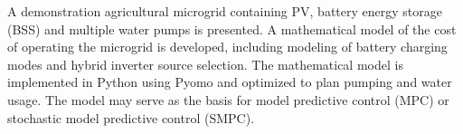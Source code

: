 A demonstration agricultural microgrid containing PV, battery energy storage (BSS) and multiple water pumps is presented.
A mathematical model of the cost of operating the microgrid is developed, including modeling of battery charging modes and hybrid inverter source selection.
The mathematical model is implemented in Python using Pyomo and optimized to plan pumping and water usage.
The model may serve as the basis for model predictive control (MPC) or stochastic model predictive control (SMPC).